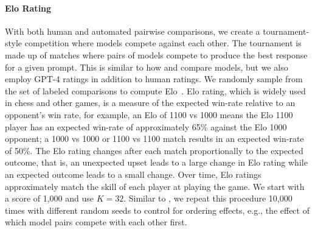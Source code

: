 \documentclass{article}
\begin{document}
\paragraph{Elo Rating}
With both human and automated pairwise comparisons, we create a tournament-style competition where models compete against each other. The tournament is made up of matches where pairs of models compete to produce the best response for a given prompt. This is similar to how \citet{bai2022training} and \citet{vicuna2023} compare models, but we also employ GPT-4 ratings in addition to human ratings. We randomly sample from the set of labeled comparisons to compute Elo~\citep{elo1967proposed,elo1978rating}. Elo rating, which is widely used in chess and other games, is a measure of the expected win-rate relative to an opponent's win rate, for example, an Elo of 1100 vs 1000 means the Elo 1100 player has an expected win-rate of approximately 65\% against the Elo 1000 opponent; a 1000 vs 1000 or 1100 vs 1100 match results in an expected win-rate of 50\%. The Elo rating changes after each match proportionally to the expected outcome, that is, an unexpected upset leads to a large change in Elo rating while an expected outcome leads to a small change. Over time, Elo ratings approximately match the skill of each player at playing the game. We start with a score of 1,000 and use $K=32$. Similar to \citet{vicuna2023}, we repeat this procedure 10,000 times with different random seeds to control for ordering effects, e.g., the effect of which model pairs compete with each other first.
\end{document}
